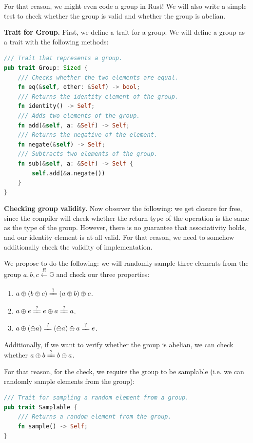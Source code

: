 \documentclass[../lecture-notes.tex]{subfiles}
\begin{document}
For that reason, we might even code a group in Rust! We will also write a simple test to check whether the group is valid and whether the group is abelian.

\textbf{Trait for Group.} First, we define a trait for a group. We will define a group as a trait with the following methods:
\begin{lstlisting}[language=Rust]
/// Trait that represents a group.
pub trait Group: Sized {
    /// Checks whether the two elements are equal.
    fn eq(&self, other: &Self) -> bool;
    /// Returns the identity element of the group.
    fn identity() -> Self;
    /// Adds two elements of the group.
    fn add(&self, a: &Self) -> Self;
    /// Returns the negative of the element.
    fn negate(&self) -> Self;
    /// Subtracts two elements of the group.
    fn sub(&self, a: &Self) -> Self {
        self.add(&a.negate())
    }
}
\end{lstlisting}

\textbf{Checking group validity.} Now observer the following: we get closure for free, since the compiler will check whether the return type of the operation is the same as the type of the group. 
However, there is no guarantee that associativity holds, and our identity element is at all valid. For that reason, we need to somehow additionally check the
validity of implementation.

We propose to do the following: we will randomly sample three elements from the group $a,b,c \xleftarrow[]{R} \mathbb{G}$ and check our three properties:
\begin{enumerate}
    \item $a \oplus (b \oplus c) \xlongequal{?} (a \oplus b) \oplus c$.
    \item $a \oplus e \xlongequal{?} e \oplus a \xlongequal{?} a $.
    \item $a \oplus (\ominus a) \xlongequal{?} (\ominus a) \oplus a \xlongequal{?} e$.
\end{enumerate}

Additionally, if we want to verify whether the group is abelian, we can check whether $a \oplus b \xlongequal{?} b \oplus a$. 

For that reason, for the check, we require the group to be samplable (i.e. we can randomly sample elements from the group):
\begin{lstlisting}[language=Rust]
/// Trait for sampling a random element from a group.
pub trait Samplable {
    /// Returns a random element from the group.
    fn sample() -> Self;
}
\end{lstlisting}
\end{document}

